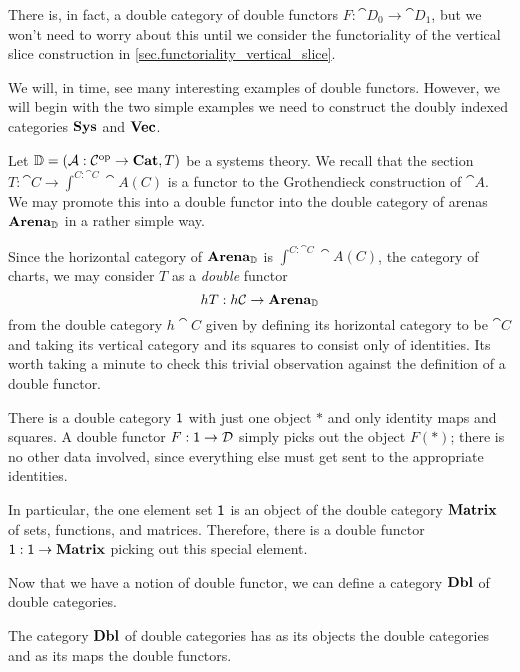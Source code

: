 \documentclass[DynamicalBook]{subfiles}
\begin{document}
\begin{remark}
There is, in fact, a double category of double functors $F : \cat{D}_0 \to
\cat{D}_1$, but we won't need to worry about this until we consider the
functoriality of the vertical slice construction in \cref{sec.functoriality_vertical_slice}.
\end{remark}

We will, in time, see many interesting examples of double functors. However, we
will begin with the two simple examples we need to
construct the doubly indexed categories $\textbf{Sys}$ and $\textbf{Vec}$.

\begin{example}\label{ex.double_functor_section}
Let $\mathbb{D} = (\mathcal{A} : \mathcal{C}^{\textnormal{op}} \to \textbf{Cat}, T)$ be a systems theory. We
recall that the section $T : \cat{C} \to \int^{C : \cat{C}}\cat{A}(C)$ is a functor to the
Grothendieck construction of $\cat{A}$. We may promote this into a double
functor into the double category of arenas $\textbf{Arena}_{\mathbb{D}}$ in a
rather simple way.

Since the horizontal category of $\textbf{Arena}_{\mathbb{D}}$ is $\int^{C : \cat{C}}
\cat{A}(C)$, the category of charts, we may consider $T$ as a \emph{double}
functor
$$hT : h\mathcal{C} \to \textbf{Arena}_{\mathbb{D}}$$
from the double category $h\cat{C}$ given by defining its horizontal category to
be $\cat{C}$ and taking its vertical category and its squares to consist only of
identities. Its worth taking a minute to check this trivial observation against
the definition of a double functor.
\end{example}

\begin{example}\label{ex.double_functor_one}
There is a double category $\mathsf{1}$ with just one object $\ast$ and only identity maps
and squares. A double functor $F : \mathsf{1} \to \mathcal{D}$ simply picks out the
object $F(\ast)$; there is no other data involved, since everything else must
get sent to the appropriate identities.

In particular, the one element set $\mathsf{1}$ is an object of the double category
$\textbf{Matrix}$ of sets, functions, and matrices. Therefore, there is a double
functor $\mathsf{1} : \mathsf{1} \to \textbf{Matrix}$ picking out this special element.
\end{example}

Now that we have a notion of double functor, we can define a category
$\textbf{Dbl}$ of double categories.
\begin{definition}\label{def.category_of_double_cats}
The category $\textbf{Dbl}$ of double categories has as its objects the double
categories and as its maps the double functors.
\end{definition}
\end{document}
